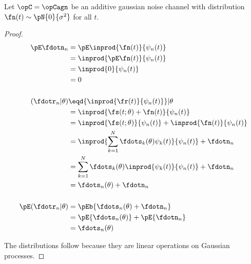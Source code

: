 \begin{theorem}%
\label{thm:agn_stats}
Let $\opC=\opCagn$ be an additive gaussian noise channel
with distribution $\fn(t)\sim\pN{0}{\sigma^2}$ for all $t$.
\end{theorem}
\begin{proof}
\begin{align*}
   \pE\fdotn_{n}
     &= \pE\inprod{\fn(t)}{\psi_n(t)}
   \\&= \inprod{\pE\fn(t)}{\psi_n(t)}
   \\&= \inprod{0}{\psi_n(t)}
   \\&= 0
\\ 
\\
   (\fdotr_n |\theta)
     &\eqd {\inprod{\fr(t)}{\psi_n(t)}}  |\theta
   \\&=    {\inprod{\fs(t;\theta)+\fn(t)}{\psi_n(t)}} 
   \\&=    {\inprod{\fs(t;\theta)}{\psi_n(t)}} +   {\inprod{\fn(t)}{\psi_n(t)}} 
   \\&=    \inprod{\sum_{k=1}^N \fdots_k(\theta) \psi_k(t)}{\psi_n(t)} + \fdotn_n 
   \\&=    \sum_{k=1}^N \fdots_k(\theta) \inprod{\psi_k(t)}{\psi_n(t)} + \fdotn_n 
   \\&=    \fdots_n(\theta)  + \fdotn_n
\\ \\
   \pE({\fdotr_n} | \theta)
     &= \pEb{\fdots_n(\theta)  + \fdotn_n}
   \\&= \pE{\fdots_n(\theta) } +   \pE{\fdotn_n}
   \\&= \fdots_n(\theta)  
\end{align*}

The distributions follow because they are linear operations on 
Gaussian processes.
\end{proof}




